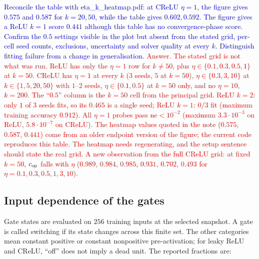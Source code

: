 \documentclass{article}
\newcommand{\zied}[1]{\textcolor{blue}{#1}}
\newcommand{\nat}[1]{\textcolor{red}{#1}}
\theoremstyle{definition}
\theoremstyle{remark}
\begin{document}
\zied{Reconcile the table with eta\_k\_heatmap.pdf: at CReLU $\eta=1$, the figure gives $0.575$ and $0.587$ for $k=20,50$, while the table gives $0.602,0.592$. The figure gives a ReLU $k=1$ score $0.441$ although this table has no convergence-phase score. Confirm the $0.5$ settings visible in the plot but absent from the stated grid, per-cell seed counts, exclusions, uncertainty and solver quality at every $k$. Distinguish fitting failure from a change in generalisation.}
\nat{Answer. The stated grid is not what was run. ReLU has only the $\eta=1$ row for $k\ne50$, plus $\eta\in\{0.1,0.3,0.5,1\}$ at $k=50$. CReLU has $\eta=1$ at every $k$ ($3$ seeds, $5$ at $k=50$), $\eta\in\{0.3,3,10\}$ at $k\in\{1,5,20,50\}$ with $1$--$2$ seeds, $\eta\in\{0.1,0.5\}$ at $k=50$ only, and no $\eta=10$, $k=200$. The ``$0.5$'' column is the $k=50$ cell from the principal grid. ReLU $k=2$: only $1$ of $3$ seeds fits, so its $0.465$ is a single seed; ReLU $k=1$: $0/3$ fit (maximum training accuracy $0.912$). All $\eta=1$ probes pass $\mathrm{ne}<10^{-2}$ (maximum $3.3\cdot10^{-3}$ on ReLU, $5.8\cdot10^{-7}$ on CReLU). The heatmap values quoted in the note ($0.575$, $0.587$, $0.441$) come from an older endpoint version of the figure; the current code reproduces this table. The heatmap needs regenerating, and the setup sentence should state the real grid. A new observation from the full CReLU grid: at fixed $k=50$, $c_{\rm op}$ falls with $\eta$ ($0.989$, $0.984$, $0.985$, $0.931$, $0.702$, $0.493$ for $\eta=0.1,0.3,0.5,1,3,10$).}

\subsection{Input dependence of the gates}\label{app:e8}

Gate states are evaluated on $256$ training inputs at the selected snapshot. A gate is called switching if its state changes across this finite set. The other categories mean constant positive or constant nonpositive pre-activation; for leaky ReLU and CReLU, ``off'' does not imply a dead unit. The reported fractions are:
\end{document}
